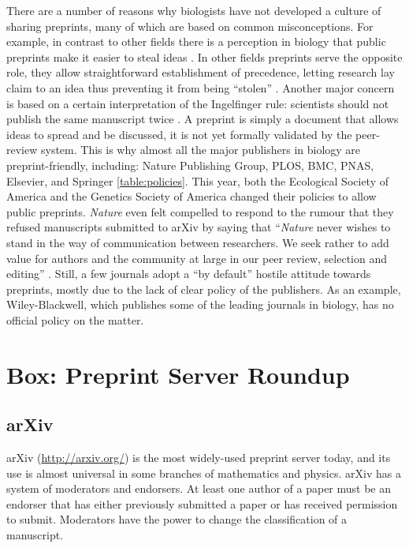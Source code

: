 \documentclass[10pt]{article}
\begin{document}
There are a number of reasons why biologists have not developed a culture of
sharing preprints, many of which are based on common misconceptions. For
example, in contrast to other fields there is a perception in biology that
public preprints make it easier to steal ideas \cite{gin11}. In other fields
preprints serve the opposite role, they allow straightforward establishment of
precedence, letting research lay claim to an idea thus preventing it from being
``stolen'' \cite{gin11}. Another major concern is based on a certain
interpretation of the Ingelfinger
rule: scientists should not publish the same manuscript twice \cite{alt96}. A
preprint is simply a document that allows ideas to spread and be discussed, it
is not yet formally validated by the peer-review system. This is why almost all
the major publishers in biology are preprint-friendly, including: Nature
Publishing Group, PLOS, BMC, PNAS, Elsevier, and Springer \ref{table:policies}.
This year, both the Ecological Society of America and the Genetics Society of
America changed their policies to allow public preprints. \emph{Nature} even
felt compelled to respond to the rumour that they refused manuscripts submitted
to arXiv by saying that ``\emph{Nature} never wishes to stand in the way of
communication between researchers. We seek rather to add value for authors and
the community at large in our peer review, selection and editing'' \cite{nat05}.
Still, a few journals adopt a ``by default'' hostile attitude towards preprints,
mostly due to the lack of clear policy of the publishers. As an example,
Wiley-Blackwell, which publishes some of the leading journals in biology, has no
official policy on the matter.

\section*{Box: Preprint Server Roundup}


\subsection*{arXiv}

arXiv (\url{http://arxiv.org/}) is the most widely-used preprint server today,
and its use is almost universal in some branches of mathematics and physics.
arXiv has a system of moderators and endorsers. At least one author of a paper
must be an endorser that has either previously submitted a paper or has received
permission to submit.  Moderators have the power to change the classification of
a manuscript.
\end{document}
